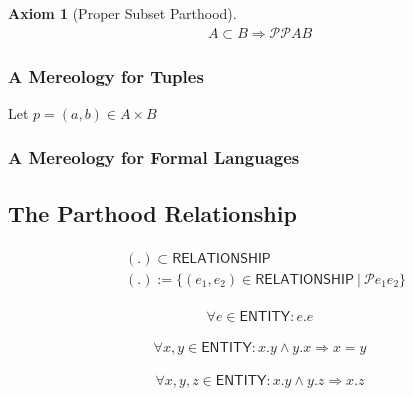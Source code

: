 \documentclass[runningheads,a4paper]{llncs}
\newtheorem{axiom}{Axiom}
\newcommand{\ENTITY}{\mathsf{ENTITY}}
\newcommand{\RELATIONSHIP}{\mathsf{RELATIONSHIP}}
\begin{document}
\begin{axiom}[Proper Subset Parthood]
\begin{align}
A \subset B \Rightarrow \mathcal{PP} A B
\end{align}
\end{axiom}


\subsubsection{A Mereology for Tuples}
Let $p = (a,b) \in A \times B$

\subsubsection{A Mereology for Formal Languages}

\subsection{The Parthood Relationship}

\begin{align}
\begin{split}
& (.)  \subset \RELATIONSHIP
\\ & (.) := \{ (e_1,e_2) \in \RELATIONSHIP ~|~ \mathcal{P} e_1 e_2 \}
\end{split}
\end{align}

\begin{align}
\forall e \in \ENTITY : e . e
\end{align}

\begin{align}
\forall x,y \in \ENTITY : x . y \wedge y . x \Rightarrow x = y
\end{align}

\begin{align}
\forall x,y,z \in \ENTITY : x . y \wedge y . z \Rightarrow x . z
\end{align}





{}
\end{document}
